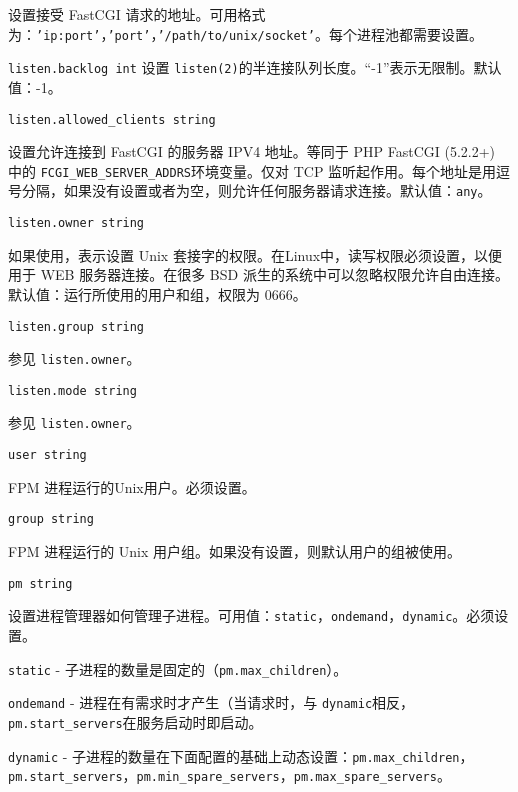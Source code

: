 \begin{compactitem}
\begin{compactitem}
设置接受 FastCGI 请求的地址。可用格式为：\texttt{'ip:port'}，\texttt{'port'}，\texttt{'/path/to/unix/socket'}。每个进程池都需要设置。

\item \texttt{listen.backlog int}
设置 \texttt{listen(2)}的半连接队列长度。“-1”表示无限制。默认值：-1。

\item \texttt{listen.allowed\_clients string}

设置允许连接到 FastCGI 的服务器 IPV4 地址。等同于 PHP FastCGI (5.2.2+) 中的 \texttt{FCGI\_WEB\_SERVER\_ADDRS}环境变量。仅对 TCP 监听起作用。每个地址是用逗号分隔，如果没有设置或者为空，则允许任何服务器请求连接。默认值：\texttt{any}。

\item \texttt{listen.owner string}

如果使用，表示设置 Unix 套接字的权限。在Linux中，读写权限必须设置，以便用于 WEB 服务器连接。在很多 BSD 派生的系统中可以忽略权限允许自由连接。默认值：运行所使用的用户和组，权限为 0666。

\item \texttt{listen.group string}

参见 \texttt{listen.owner}。

\item \texttt{listen.mode string}

参见 \texttt{listen.owner}。

\item \texttt{user string}

FPM 进程运行的Unix用户。必须设置。

\item \texttt{group string}

FPM 进程运行的 Unix 用户组。如果没有设置，则默认用户的组被使用。

\item \texttt{pm string}

设置进程管理器如何管理子进程。可用值：\texttt{static}，\texttt{ondemand}，\texttt{dynamic}。必须设置。

\begin{compactitem}
\item \texttt{static} - 子进程的数量是固定的（\texttt{pm.max\_children}）。
\item \texttt{ondemand} - 进程在有需求时才产生（当请求时，与 \texttt{dynamic}相反，\texttt{pm.start\_servers}在服务启动时即启动。
\item \texttt{dynamic} - 子进程的数量在下面配置的基础上动态设置：\texttt{pm.max\_children}，\texttt{pm.start\_servers}，\texttt{pm.min\_spare\_servers}，\texttt{pm.max\_spare\_servers}。
\end{compactitem}



\end{compactitem}
\end{compactitem}
